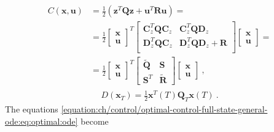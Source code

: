 \documentclass[letterpaper,10pt,english]{jupyterBook}
\begin{document}
\begin{equation*}
\begin{split}\begin{aligned}
C(\mathbf{x},\mathbf{u})
 & = \frac{1}{2} \left( \mathbf{z}^T \mathbf{Q} \mathbf{z} + \mathbf{u}^T \mathbf{R} \mathbf{u} \right) = \\
 & = \frac{1}{2} \begin{bmatrix} \mathbf{x} \\ \mathbf{u} \end{bmatrix}^T
               \begin{bmatrix}
                 \mathbf{C}_z^T \mathbf{Q} \mathbf{C}_z & \mathbf{C}_z^T \mathbf{Q} \mathbf{D}_z \\
                 \mathbf{D}_z^T \mathbf{Q} \mathbf{C}_z & \mathbf{D}_z^T \mathbf{Q} \mathbf{D}_z + \mathbf{R} \\
               \end{bmatrix}
               \begin{bmatrix} \mathbf{x} \\ \mathbf{u} \end{bmatrix} = \\
 & = \frac{1}{2} \begin{bmatrix} \mathbf{x} \\ \mathbf{u} \end{bmatrix}^T
               \begin{bmatrix}
                 \widetilde{\mathbf{Q}} & \mathbf{S} \\
                 \mathbf{S}^T & \widetilde{\mathbf{R}}
               \end{bmatrix}
               \begin{bmatrix} \mathbf{x} \\ \mathbf{u} \end{bmatrix}\ ,
\end{aligned}\end{split}
\end{equation*}\begin{equation*}
\begin{split}D(\mathbf{x}_T) = \frac{1}{2} \mathbf{x}^T(T) \mathbf{Q}_T \mathbf{x}(T) \ .\end{split}
\end{equation*}
\sphinxAtStartPar
The equations \eqref{equation:ch/control/optimal-control-full-state-general-ode:eq:optimal:ode} become
\end{document}
